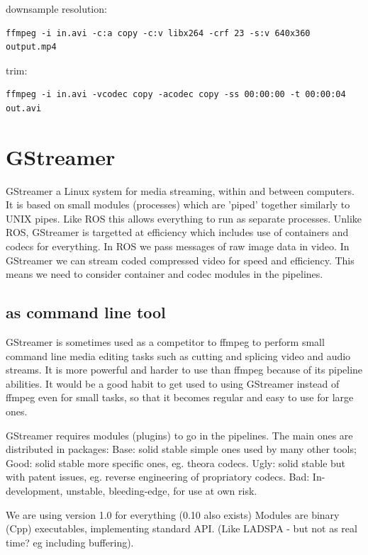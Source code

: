 \documentclass[oneside,english]{scrbook}
\begin{document}
downsample resolution: 
\begin{lstlisting}
ffmpeg -i in.avi -c:a copy -c:v libx264 -crf 23 -s:v 640x360 output.mp4
\end{lstlisting}

trim:
\begin{lstlisting}
ffmpeg -i in.avi -vcodec copy -acodec copy -ss 00:00:00 -t 00:00:04 out.avi
\end{lstlisting}



\chapter{GStreamer}

GStreamer a Linux system for media streaming, within and between computers. It is based on small modules (processes) which are 'piped' together similarly to UNIX pipes.  Like ROS this allows everything to run as separate processes. Unlike ROS, GStreamer is targetted at efficiency which includes use of containers and codecs for everything. In ROS we pass messages of raw image data in video. In GStreamer we can stream coded compressed video for speed and efficiency.  This means we need to consider container and codec modules in the pipelines.

\section{as command line tool}

GStreamer is sometimes used as a competitor to ffmpeg to perform small command line media editing tasks such as cutting and splicing video and audio streams. It is more powerful and harder to use than ffmpeg because of its pipeline abilities.  It would be a good habit to get used to using GStreamer instead of ffmpeg even for small tasks, so that it becomes regular and easy to use for large ones.

GStreamer requires modules (plugins) to go in the pipelines. The main ones are distributed in packages:
 Base: solid stable simple ones used by many other tools;
 Good: solid stable more specific ones, eg. theora codecs.
 Ugly: solid stable but with patent issues, eg. reverse engineering of propriatory codecs.
 Bad: In-development, unstable, bleeding-edge, for use at own risk.

We are using version 1.0 for everything (0.10 also exists) Modules
are binary (Cpp) executables, implementing standard API. (Like LADSPA
- but not as real time? eg including buffering).
\end{document}
